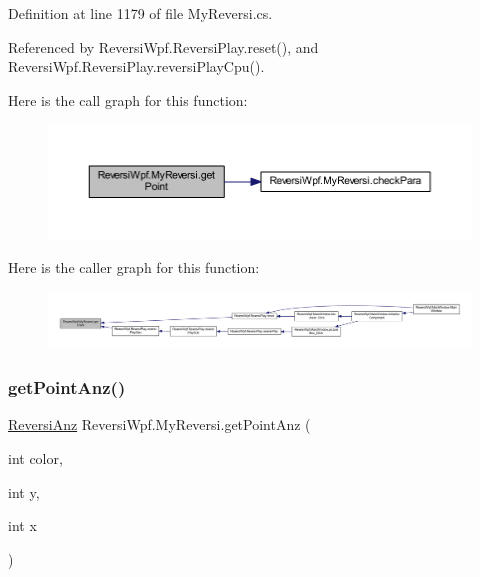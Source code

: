 Definition at line 1179 of file My\+Reversi.\+cs.



Referenced by Reversi\+Wpf.\+Reversi\+Play.\+reset(), and Reversi\+Wpf.\+Reversi\+Play.\+reversi\+Play\+Cpu().

Here is the call graph for this function\+:\nopagebreak
\begin{figure}[H]
\begin{center}
\leavevmode
\includegraphics[width=350pt]{class_reversi_wpf_1_1_my_reversi_a4e31d8df5c6759c2f6afea00f8332706_cgraph}
\end{center}
\end{figure}
Here is the caller graph for this function\+:\nopagebreak
\begin{figure}[H]
\begin{center}
\leavevmode
\includegraphics[width=350pt]{class_reversi_wpf_1_1_my_reversi_a4e31d8df5c6759c2f6afea00f8332706_icgraph}
\end{center}
\end{figure}
\mbox{\label{class_reversi_wpf_1_1_my_reversi_af60c852859185c303ebd4d9b5b3f8700}} 
\subsubsection{\texorpdfstring{get\+Point\+Anz()}{getPointAnz()}}
{\footnotesize\ttfamily \hyperlink{class_reversi_wpf_1_1_reversi_anz}{Reversi\+Anz} Reversi\+Wpf.\+My\+Reversi.\+get\+Point\+Anz (\begin{DoxyParamCaption}\item[{int}]{color,  }\item[{int}]{y,  }\item[{int}]{x }\end{DoxyParamCaption})}



